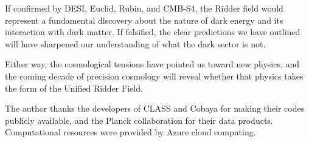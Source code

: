 \documentclass[twocolumn,showpacs,preprintnumbers,amsmath,amssymb,prd]{revtex4-2}
\begin{document}
If confirmed by DESI, Euclid, Rubin, and CMB-S4, the Ridder field would represent a fundamental discovery about the nature of dark energy and its interaction with dark matter. If falsified, the clear predictions we have outlined will have sharpened our understanding of what the dark sector is not.

Either way, the cosmological tensions have pointed us toward new physics, and the coming decade of precision cosmology will reveal whether that physics takes the form of the Unified Ridder Field.

\begin{acknowledgments}
The author thanks the developers of CLASS and Cobaya for making their codes publicly available, and the Planck collaboration for their data products. Computational resources were provided by Azure cloud computing.
\end{acknowledgments}


\end{document}
